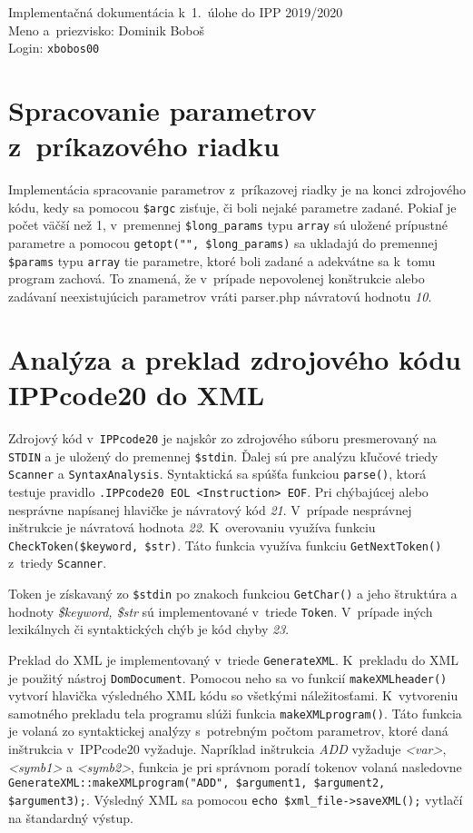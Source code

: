 \documentclass[11pt, a4paper]{article}
\begin{document}
    {\parindent 0pt \Large
        Implementačná dokumentácia k~1.~úlohe do IPP 2019/2020\\
        Meno a~priezvisko: Dominik Boboš \\
        Login: \texttt{xbobos00}
    }
    
    \section{Spracovanie parametrov z~príkazového riadku}
    
    Implementácia spracovanie parametrov z~príkazovej riadky je na konci zdrojového kódu, kedy sa pomocou \texttt{\$argc} zisťuje, či boli nejaké parametre zadané. Pokiaľ je počet väčší než 1, v~premennej \texttt{\$long\_params} typu \texttt{array} sú uložené prípustné parametre a pomocou \texttt{getopt("", \$long\_params)} sa ukladajú do premennej \texttt{\$params} typu \texttt{array} tie parametre, ktoré boli zadané a adekvátne sa k~tomu program zachová. To znamená, že v~prípade nepovolenej konštrukcie alebo zadávaní neexistujúcich parametrov vráti parser.php návratovú hodnotu \emph{10}.
    
    
     \section{Analýza a preklad zdrojového kódu IPPcode20 do XML}
     Zdrojový kód v~\texttt{IPPcode20} je najskôr zo zdrojového súboru presmerovaný na \texttt{STDIN} a je uložený do premennej \texttt{\$stdin}. Ďalej sú pre analýzu kľučové triedy \texttt{Scanner} a \texttt{SyntaxAnalysis}. Syntaktická sa spú\-šťa funkciou \texttt{parse()}, ktorá testuje pravidlo \texttt{.IPPcode20 EOL <Instruction> EOF}. Pri chýbajúcej alebo nesprávne napísanej hlavičke je návratový kód \emph{21}. V~prípade nesprávnej inštrukcie je návratová hodnota \emph{22}. K~overovaniu využíva funkciu \texttt{CheckToken(\$keyword, \$str)}. Táto funkcia využíva funkciu \texttt{GetNextToken()} z~triedy \texttt{Scanner}. 

Token je získavaný zo \texttt{\$stdin} po znakoch funkciou \texttt{GetChar()} a jeho štruktúra a hodnoty \emph{\$keyword, \$str} sú implementované v~triede \texttt{Token}. V~prípade iných lexikálnych či syntaktických chýb je kód chyby \emph{23}.

Preklad do XML je implementovaný v~triede \texttt{GenerateXML}. K~prekladu do XML je použitý nástroj \texttt{DomDocument}. Pomocou neho  sa vo funkcií \texttt{makeXMLheader()} vytvorí hlavička výsledného XML kódu so všetkými náležitosťami. K~vytvoreniu samotného prekladu tela programu slúži funkcia \texttt{makeXMLprogram()}. Táto funkcia je volaná zo syntaktickej analýzy s~potrebným počtom parametrov, ktoré daná inštrukcia v~IPPcode20 vyžaduje. Napríklad inštrukcia \emph{ADD} vyžaduje \emph{<var>}, \emph{<symb1>} a \emph{<symb2>}, funkcia je pri správnom poradí tokenov volaná nasledovne \texttt{GenerateXML::makeXMLprogram("ADD", \$argument1, \$argument2, \$argument3);}. Výsledný XML sa pomocou \texttt{echo \$xml\_file->saveXML();} vytlačí na štandardný výstup.
\end{document}
